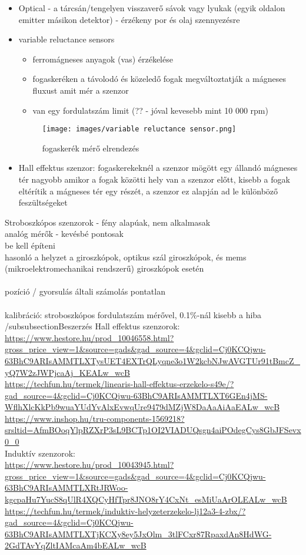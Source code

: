 \documentclass{article}
\begin{document}
	\begin{itemize}
		\item Optical - a tárcsán/tengelyen visszaverő sávok vagy lyukak (egyik oldalon emitter másikon detektor) - érzékeny por és olaj szennyezésre
		\item variable reluctance sensors
		\begin{itemize}
			\item ferromágneses anyagok (vas) érzékelése
			\item fogaskeréken a távolodó és közeledő fogak megváltoztatják a mágneses fluxust amit mér a szenzor
			\item van egy fordulatszám limit (?? - jóval kevesebb mint 10 000 rpm)
		\end{itemize}
		\begin{figure}[h]
			\caption{fogaskerék mérő elrendezés}
			\centering
			\texttt{[image: images/variable reluctance sensor.png]}
		\end{figure}
		\item Hall effektus szenzor:  fogaskerekeknél a szenzor mögött egy állandó mágneses tér nagyobb amikor a fogak közötti hely van a szenzor előtt, kisebb a fogak eltérítik a mágneses tér egy részét, a szenzor ez alapján ad le különböző feszültségeket
	\end{itemize}
	Stroboszkópos szenzorok - fény alapúak, nem alkalmasak \\
	analóg mérők - kevésbé pontosak\\
	be kell építeni\\
	hasonló a helyzet a giroszkópok, optikus szál giroszkópok, és mems (mikroelektromechanikai rendszerű) giroszkópok esetén\\
	\\
	pozíció / gyorsulás általi számolás pontatlan\\
	\\
	kalibráció: stroboszkópos fordulatszám mérővel, 0.1\%-nál kisebb a hiba\\
	
	/subsubsection{Beszerzés}
	Hall effektus szenzorok:\\
	\url{https://www.hestore.hu/prod_10046558.html?gross_price_view=1&source=gads&gad_source=4&gclid=Cj0KCQjwu-63BhC9ARIsAMMTLXTysUET4EXTrQLyqne3o1W2kcbNJwAVGTUr91tBmcZ_yQ7W2zJWPjcaAj_KEALw_wcB}\\
	\url{https://techfun.hu/termek/linearis-hall-effektus-erzekelo-s49e/?gad_source=4&gclid=Cj0KCQjwu-63BhC9ARIsAMMTLXT6GEn4jMS-WflhXlcKkPb9wuaYUdYvAlxEvwqUre9479dMZjW8DaAaAiAaEALw_wcB}\\
	\url{https://www.inshop.hu/tru-components-1569218?srsltid=AfmBOoqYlpRZXrP3sL9BCTp1OI2VIADUQsgn4aiPOdegCys8GbJFSevx0_0}\\
	Induktív szenzorok:\\
	\url{https://www.hestore.hu/prod_10043945.html?gross_price_view=1&source=gads&gad_source=4&gclid=Cj0KCQjwu-63BhC9ARIsAMMTLXRtJRWoo-kgcpaHu7YucS8qUlR4XQCyHfTpr8JNO8rY4CxNt_esMiUaArOLEALw_wcB}\\
	\url{https://techfun.hu/termek/induktiv-helyzeterzekelo-lj12a3-4-zbx/?gad_source=4&gclid=Cj0KCQjwu-63BhC9ARIsAMMTLXTjKCXy8ey5JxOlm_3tlFCxr87RpaxdAn8HdWG-2GdTAvYqZltIAMcaAm4bEALw_wcB}
	
\end{document}
